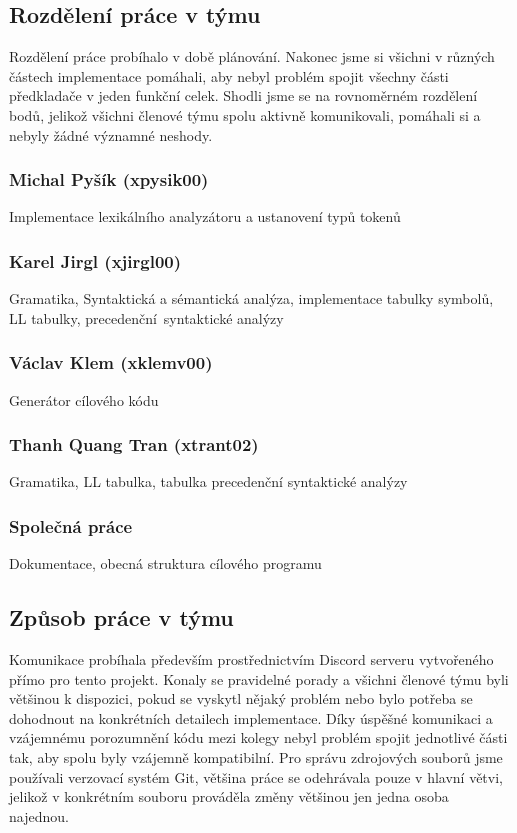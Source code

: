 \documentclass[a4paper, 12pt]{article}
\begin{document}
\subsection{Rozdělení práce v týmu}
Rozdělení práce probíhalo v době plánování. Nakonec jsme si všichni v různých částech implementace pomáhali, aby nebyl problém spojit všechny části předkladače v jeden funkční celek. Shodli jsme se na rovnoměrném rozdělení bodů, jelikož všichni členové týmu spolu aktivně komunikovali, pomáhali si a nebyly žádné významné neshody. 

\subsubsection*{Michal Pyšík (xpysik00)}
Implementace lexikálního analyzátoru a ustanovení typů tokenů

\subsubsection*{Karel Jirgl (xjirgl00)}
Gramatika, Syntaktická a sémantická analýza, implementace tabulky symbolů, LL tabulky, precedenční~syntaktické analýzy

\subsubsection*{Václav Klem (xklemv00) }
Generátor cílového kódu

\subsubsection*{Thanh Quang Tran (xtrant02)}
Gramatika, LL tabulka, tabulka precedenční syntaktické analýzy 

\subsubsection*{Společná práce}
Dokumentace, obecná struktura cílového programu

\subsection{Způsob práce v týmu}
Komunikace probíhala především prostřednictvím Discord serveru vytvořeného přímo pro tento projekt. Konaly se pravidelné porady a všichni členové týmu byli většinou k dispozici, pokud se vyskytl nějaký problém nebo bylo potřeba se dohodnout na konkrétních detailech implementace. Díky úspěšné komunikaci a vzájemnému porozumnění kódu mezi kolegy nebyl problém spojit jednotlivé části tak, aby spolu byly vzájemně kompatibilní. Pro správu zdrojových souborů jsme používali verzovací systém Git, většina práce se odehrávala pouze v hlavní větvi, jelikož v konkrétním souboru prováděla změny většinou jen jedna osoba najednou.
\end{document}
